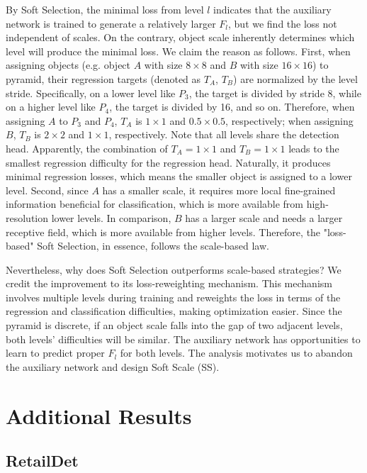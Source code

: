 \documentclass[runningheads]{llncs}
\begin{document}
By Soft Selection, the minimal loss from level $l$ indicates that the auxiliary network is trained to generate a relatively larger $F_l$, but we find the loss not independent of scales. On the contrary, object scale inherently determines which level will produce the minimal loss. We claim the reason as follows. First, when assigning objects (e.g. object $A$ with size $8\times8$ and $B$ with size $16\times16$) to pyramid, their regression targets (denoted as $T_A$, $T_B$) are normalized by the level stride. Specifically, on a lower level like $P_3$, the target is divided by stride 8, while on a higher level like $P_4$, the target is divided by 16, and so on. Therefore, when assigning $A$ to $P_3$ and $P_4$, $T_A$ is $1\times1$ and $0.5\times0.5$, respectively; when assigning $B$, $T_B$ is $2\times2$ and $1\times1$, respectively. Note that all levels share the detection head. Apparently, the combination of $T_A=1\times1$ and $T_B = 1\times1$ leads to the smallest regression difficulty for the regression head. Naturally, it produces minimal regression losses, which means the smaller object is assigned to a lower level. Second, since $A$ has a smaller scale, it requires more local fine-grained information beneficial for classification, which is more available from high-resolution lower levels. In comparison, $B$ has a larger scale and needs a larger receptive field, which is more available from higher levels. Therefore, the "loss-based" Soft Selection, in essence, follows the scale-based law. 

Nevertheless, why does Soft Selection outperforms scale-based strategies? We credit the improvement to its loss-reweighting mechanism. This mechanism involves multiple levels during training and reweights the loss in terms of the regression and classification difficulties, making optimization easier. Since the pyramid is discrete, if an object scale falls into the gap of two adjacent levels, both levels' difficulties will be similar. The auxiliary network has opportunities to learn to predict proper $F_l$ for both levels. The analysis motivates us to abandon the auxiliary network and design Soft Scale (SS). 


\section{Additional Results}

\subsection{RetailDet}
\end{document}
